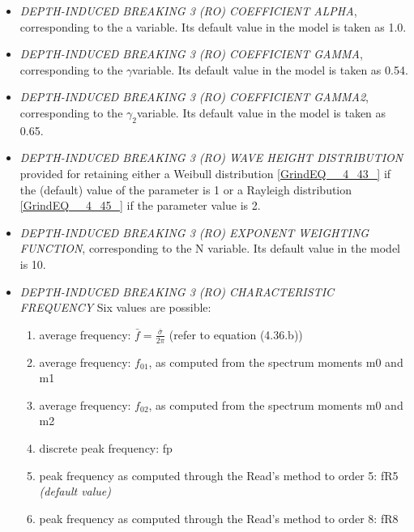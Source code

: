 \begin{itemize}
\item  \textit{DEPTH-INDUCED BREAKING 3 (RO) COEFFICIENT ALPHA}, corresponding to the a  variable. Its default value in the model is taken as 1.0.

\item  \textit{DEPTH-INDUCED BREAKING 3 (RO) COEFFICIENT GAMMA},
 corresponding to the $\gamma $variable. Its default value in the model is taken as 0.54.

\item  \textit{DEPTH-INDUCED BREAKING 3 (RO) COEFFICIENT GAMMA2},  corresponding to the $\gamma _{2} $variable. Its default value in the model is taken as 0.65.

\item  \textit{DEPTH-INDUCED BREAKING 3 (RO) WAVE HEIGHT DISTRIBUTION} provided for retaining either a Weibull distribution \eqref{GrindEQ__4_43_} if the (default) value of the parameter is 1 or a Rayleigh distribution \eqref{GrindEQ__4_45_} if the parameter value is 2.

\item  \textit{DEPTH-INDUCED BREAKING 3 (RO) EXPONENT WEIGHTING FUNCTION}, corresponding to the N variable. Its default value in the model is 10.

\item  \textit{DEPTH-INDUCED BREAKING 3 (RO) CHARACTERISTIC FREQUENCY} Six values are possible:\textit{}
\begin{enumerate}

 \item average frequency: $\bar{f}=\frac{\bar{\sigma }}{2\pi } $  (refer to equation (4.36.b))

 \item average frequency: $f_{01} $, as computed from the spectrum moments m0 and m1

 \item average frequency: $f_{02} $, as computed from the spectrum moments m0 and m2

 \item discrete peak frequency: fp

 \item peak frequency as computed through the Read's method to order 5: fR5 \textit{(default value)}

 \item peak frequency as computed through the Read's method to order 8: fR8
\end{enumerate}
\end{itemize}


